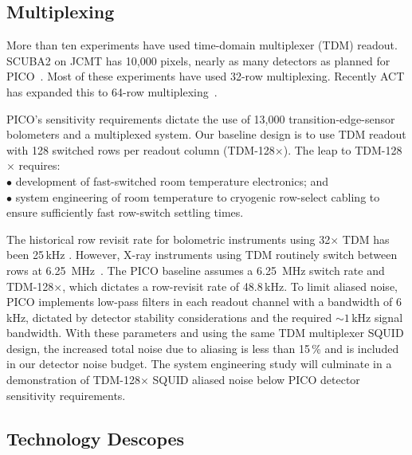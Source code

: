 \subsection{Multiplexing}
\label{sec:multiplexing}

More than ten experiments have used time-domain multiplexer (TDM) readout. SCUBA2 on JCMT has 10,000 pixels, nearly as many detectors as planned for PICO~\citep{Holland2013}. Most of these experiments have used 32-row multiplexing. Recently ACT has expanded this to 64-row multiplexing~\citep{Henderson2016}.

PICO's sensitivity requirements dictate the use of 13,000 transition-edge-sensor bolometers and a multiplexed system.  Our baseline design is to use TDM readout with 128 switched rows per readout column (TDM-128$\times$). The leap to TDM-128$\times$ requires: \\
$\bullet$ development of fast-switched room temperature electronics; and \\
$\bullet$ system engineering of room temperature to cryogenic row-select cabling to ensure sufficiently fast row-switch settling times.

The historical row revisit rate for bolometric instruments using 32$\times$ TDM has been 25\,kHz \cite[e.g.,][]{BICEP2015}. However, X-ray instruments using TDM routinely switch between rows at 6.25~MHz~\citep{Doriese2016}. The PICO baseline assumes a 6.25~MHz switch rate and TDM-128$\times$, which dictates a row-revisit rate %
of 48.8\,kHz. To limit aliased noise, PICO implements low-pass filters in each readout channel with a bandwidth of 6\,kHz, dictated by detector stability considerations and the required $\sim1$\,kHz signal bandwidth.  With these parameters and using the same TDM multiplexer SQUID design, the increased total noise due to aliasing is less than 15\,\% and is included in our detector noise budget.  The system engineering study will culminate in a demonstration of TDM-128$\times$ SQUID aliased noise below PICO detector sensitivity requirements.


\subsection{Technology Descopes}
\label{sec:technology_descopes} %

